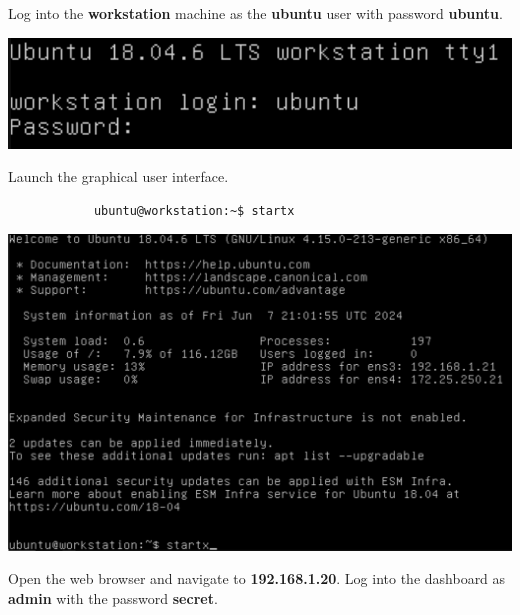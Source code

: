 \documentclass[letterpaper, 12pt]{article}
\begin{document}
\begin{enumerate}
    \begin{labstep}
        Log into the \textbf{workstation} machine as the \textbf{ubuntu} user with password \textbf{ubuntu}.

        \begin{center}
            \includegraphics[width=\linewidth]{images/part1/step1.png}
        \end{center}
    \end{labstep}

    \begin{labstep}
        Launch the graphical user interface.
        \begin{lstlisting}
            ubuntu@workstation:~$ startx
        \end{lstlisting}

        \begin{center}
            \includegraphics[width=\linewidth]{images/part1/step2.png}
        \end{center}
    \end{labstep}

    \begin{labstep}
        Open the web browser and navigate to \textbf{192.168.1.20}.
        Log into the dashboard as \textbf{admin} with the password \textbf{secret}.
    \end{labstep}


\end{enumerate}
\end{document}
